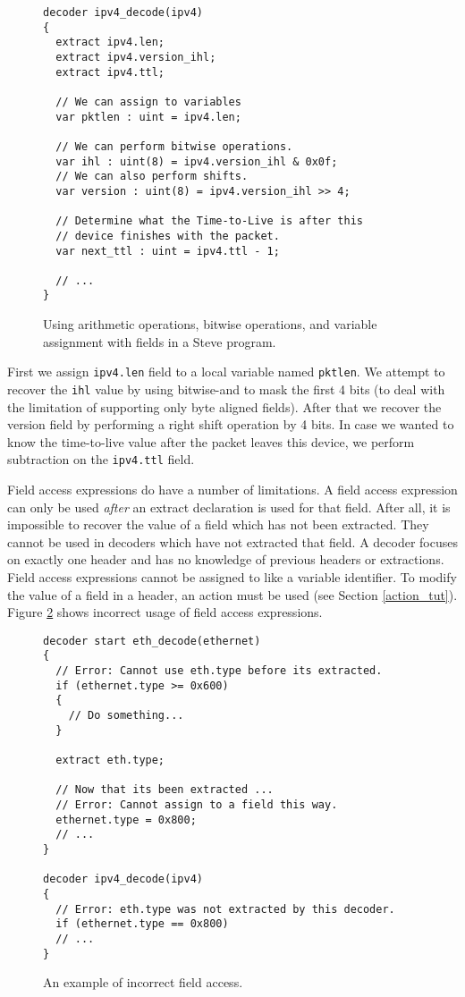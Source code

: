 \begin{figure}[ht]
\begin{lstlisting}
decoder ipv4_decode(ipv4)
{
  extract ipv4.len;
  extract ipv4.version_ihl;
  extract ipv4.ttl;
  
  // We can assign to variables
  var pktlen : uint = ipv4.len;
  
  // We can perform bitwise operations.
  var ihl : uint(8) = ipv4.version_ihl & 0x0f;
  // We can also perform shifts.
  var version : uint(8) = ipv4.version_ihl >> 4;
  
  // Determine what the Time-to-Live is after this
  // device finishes with the packet.
  var next_ttl : uint = ipv4.ttl - 1;
  
  // ...
}
\end{lstlisting}
\caption{Using arithmetic operations, bitwise operations, and variable assignment with fields in a Steve program.}
\label{fg:assign_arith_ex}
\end{figure}

First we assign \texttt{ipv4.len} field to a local variable named \texttt{pktlen}. We attempt to recover the \texttt{ihl} value by using bitwise-and to mask the first 4 bits (to deal with the limitation of supporting only byte aligned fields). After that we recover the version field by performing a right shift operation by 4 bits. In case we wanted to know the time-to-live value after the packet leaves this device, we perform subtraction on the \texttt{ipv4.ttl} field.

Field access expressions do have a number of limitations. A field access expression can only be used \textit{after} an extract declaration is used for that field. After all, it is impossible to recover the value of a field which has not been extracted. They cannot be used in decoders which have not extracted that field. A decoder focuses on exactly one header and has no knowledge of previous headers or extractions. Field access expressions cannot be assigned to like a variable identifier. To modify the value of a field in a header, an action must be used (see Section \ref{action_tut}). Figure \ref{fg:bad_access_ex} shows incorrect usage of field access expressions.

\begin{figure}[ht]
\begin{lstlisting}
decoder start eth_decode(ethernet)
{
  // Error: Cannot use eth.type before its extracted.
  if (ethernet.type >= 0x600) 
  {
    // Do something...
  }
  
  extract eth.type;
  
  // Now that its been extracted ...
  // Error: Cannot assign to a field this way.
  ethernet.type = 0x800;
  // ...
}

decoder ipv4_decode(ipv4)
{
  // Error: eth.type was not extracted by this decoder.
  if (ethernet.type == 0x800)
  // ...
}
\end{lstlisting}
\caption{An example of incorrect field access.}
\label{fg:bad_access_ex}
\end{figure}

